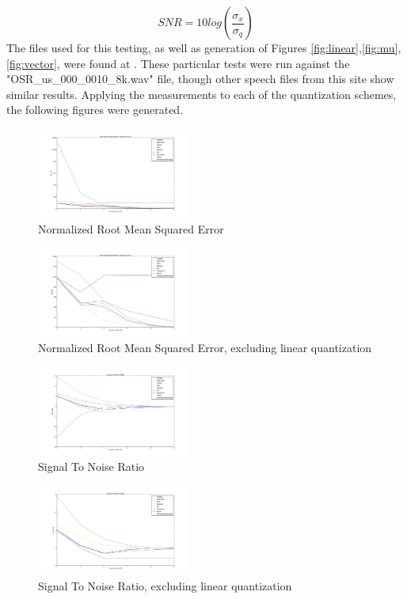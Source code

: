 \documentclass[journal]{IEEEtran}
\begin{document}
\begin{equation}
    SNR = 10log(\frac{\sigma_x}{\sigma_q})
    \label{eq:SNR}
\end{equation}
The files used for this testing, as well as generation of Figures \ref{fig:linear},\ref{fig:mu},\ref{fig:vector}, were found at \cite{sourceWeb}. These
particular tests were run against the "OSR\_us\_000\_0010\_8k.wav" file, though other speech files from this site show similar results. Applying the
measurements to each of the quantization schemes, the following figures were generated. 
\begin{figure}[h!]
\centering
  \includegraphics[width=0.45\textwidth]{NRMSE_all.png}
\caption{Normalized Root Mean Squared Error}
\label{fig:NRMSE_all}
\end{figure}
\begin{figure}[h!]
\centering
  \includegraphics[width=0.45\textwidth]{NRMSE_nolinear.png}
\caption{Normalized Root Mean Squared Error, excluding linear quantization}
\label{fig:NRMSE_nolinear}
\end{figure}
\begin{figure}[h!]
\centering
  \includegraphics[width=0.45\textwidth]{SNR_all.png}
\caption{Signal To Noise Ratio}
\label{fig:SNR_all}
\end{figure}
\begin{figure}[h!]
\centering
  \includegraphics[width=0.45\textwidth]{SNR_nolinear.png}
\caption{Signal To Noise Ratio, excluding linear quantization}
\label{fig:SNR_nolinear}
\end{figure}
\end{document}
